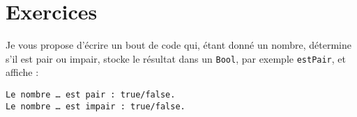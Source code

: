 \section*{Exercices}
{}
Je vous propose d'écrire un bout de code qui, étant donné un nombre,
détermine s'il est pair ou impair, stocke le résultat dans un \texttt{Bool}, par exemple \texttt{estPair}, et affiche :
\begin{verbatim}
Le nombre … est pair : true/false.
Le nombre … est impair : true/false.
\end{verbatim}